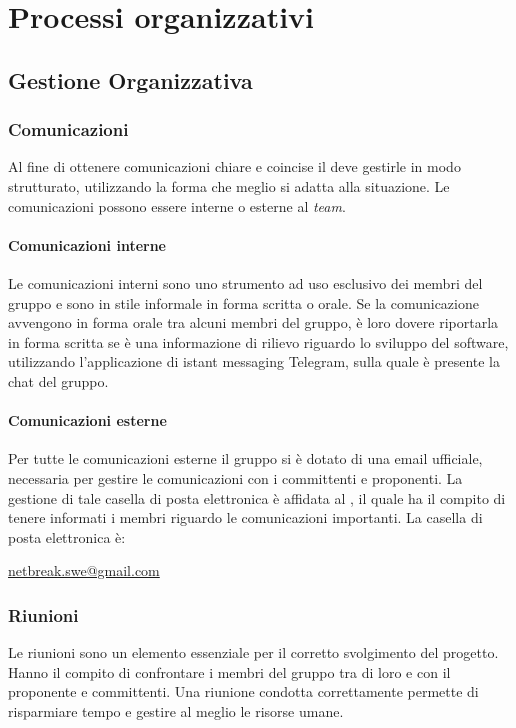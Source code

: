 \newpage

\section{Processi organizzativi}

\subsection{Gestione Organizzativa}
	\subsubsection{Comunicazioni}
	Al fine di ottenere comunicazioni chiare e coincise il \textit{\RdP} deve gestirle in modo strutturato, utilizzando la forma che meglio si adatta alla situazione.
	Le comunicazioni possono essere interne o esterne al \textit{team}.
		\paragraph{Comunicazioni interne}
		Le comunicazioni interni sono uno strumento ad uso esclusivo dei membri del gruppo e sono in stile informale in forma scritta o orale. 
		Se la comunicazione avvengono in forma orale tra alcuni membri del gruppo, è loro dovere riportarla  in forma scritta se è una informazione di rilievo riguardo lo sviluppo del software, utilizzando l’applicazione di istant messaging Telegram, sulla quale è presente la chat del gruppo.

		\paragraph{Comunicazioni esterne}
		Per tutte le comunicazioni esterne il gruppo si è dotato di una email ufficiale, necessaria per gestire le comunicazioni con i committenti e proponenti. La gestione di tale casella di posta elettronica è affidata al \textit{\RdP}, il quale ha il compito di tenere informati i membri riguardo le comunicazioni importanti. La casella di posta elettronica è:
		
			\begin{center}
				\url{netbreak.swe@gmail.com} 
			\end{center}
			
	\subsubsection{Riunioni}
		Le riunioni sono un elemento essenziale per il corretto svolgimento del progetto. Hanno il compito di confrontare i membri del gruppo tra di loro e con il proponente e committenti. Una riunione condotta correttamente permette di risparmiare tempo e gestire al meglio le risorse umane.
